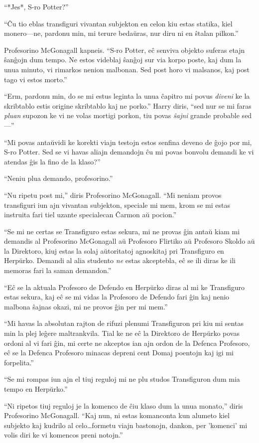 ``*Jes*, S-ro Potter?''

``Ĉu tio eblas transfiguri vivantan subjekton en celon kiu estas
statika, kiel monero—ne, pardonu min, mi terure bedaŭras, nur diru ni
en ŝtalan pilkon.''

Profesorino McGonagall kapneis. ``S-ro Potter, eĉ senviva objekto
suferas etajn ŝanĝojn dum tempo. Ne estos videblaj ŝanĝoj sur via
korpo poste, kaj dum la unua minuto, vi rimarkos nenion malbonan. Sed
post horo vi malsanos, kaj post tago vi estos morto.''

``Erm, pardonu min, do se mi estus leginta la unua ĉapitro mi povus
\emph{diveni} ke la skribtablo estis origine skribtablo kaj ne
porko.'' Harry diris, ``sed nur se mi faras \emph{pluan} supozon ke vi
ne volas mortigi porkon, tiu povas \emph{ŝajni} grande probable
sed—''

``Mi povas antaŭvidi ke korekti viajn testojn estos senfina deveno de
ĝojo por mi, S-ro Potter. Sed se vi havas aliajn demandojn ĉu mi povas
bonvolu demandi ke vi atendas ĝis la fino de la klaso?''

``Neniu plua demando, profesorino.''

``Nu ripetu post mi,'' diris Profesorino McGonagall. ``Mi neniam
provos transfiguri iun ajn vivantan subjekton, speciale mi mem, krom
se mi estas instruita fari tiel uzante specialecan Ĉarmon aŭ pocion.''

``Se mi ne certas se Transfiguro estas sekura, mi ne provas ĝin antaŭ
kiam mi demandis al Profesorino McGonagall aŭ Profesoro Flirtiko aŭ
Profesoro Skoldo aŭ la Direktoro, kiuj estas la solaj aŭtoritatoj
agnoskitaj pri Transfiguro en Herpŭrko. Demandi al alia studento
\emph{ne} estas akceptebla, eĉ se ili diras ke ili memoras fari la
saman demandon.''

``Eĉ se la aktuala Profesoro de Defendo en Herpŭrko diras al mi ke
Transfiguro estas sekura, kaj eĉ se mi vidas la Profesoro de Defendo
fari ĝin kaj nenio malbona ŝajnas okazi, mi ne provos ĝin per mi
mem.''


``Mi havas la absolutan rajton de rifuzi plenumi Transfiguron pri kiu
mi sentas min la plej leĝere maltrankvila. Tial ke ne eĉ la Direktoro
de Herpŭrko povas ordoni al vi fari ĝin, mi certe ne akceptos ian ajn
ordon de la Defenca Profesoro, eĉ se la Defenca Profesoro minacas
depreni cent Domaj poentojn kaj igi mi forpelita.''

``Se mi rompas iun ajn el tiuj reguloj mi ne plu studos Transfiguron
dum mia tempo en Herpŭrko.''

``Ni ripetos tiuj reguloj je la komenco de ĉiu klaso dum la unua
monato,'' diris Profesorino McGonagall. ``Kaj nun, ni estas komanconta
kun alumeto kiel subjekto kaj kudrilo al celo\ldots formetu viajn
bastonojn, dankon, per 'komenci' mi volis diri ke vi komencos preni
notojn.''

